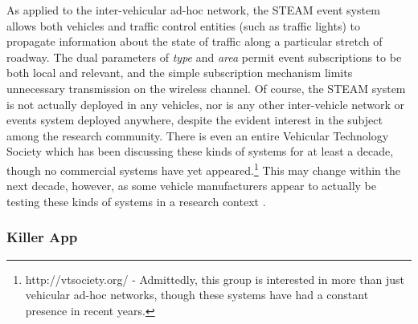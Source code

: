 \documentclass{acm_proc_article-sp}
\begin{document}
As applied to the inter-vehicular ad-hoc network, the STEAM event system allows both vehicles and traffic control entities (such as traffic lights) to propagate information about the state of traffic along a particular stretch of roadway. The dual parameters of {\em type} and {\em area} permit event subscriptions to be both local and relevant, and the simple subscription mechanism limits unnecessary transmission on the wireless channel. Of course, the STEAM system is not actually deployed in any vehicles, nor is any other inter-vehicle network or events system deployed anywhere, despite the evident interest in the subject among the research community. There is even an entire Vehicular Technology Society which has been discussing these kinds of systems for at least a decade, though no commercial systems have yet appeared.\footnote{http://vtsociety.org/ - Admittedly, this group is interested in more than just vehicular ad-hoc networks, though these systems have had a constant presence in recent years.} This may change within the next decade, however, as some vehicle manufacturers appear to actually be testing these kinds of systems in a research context \cite{ford}.




\subsubsection{Killer App}
\label{sec:appsebgood}

\end{document}

